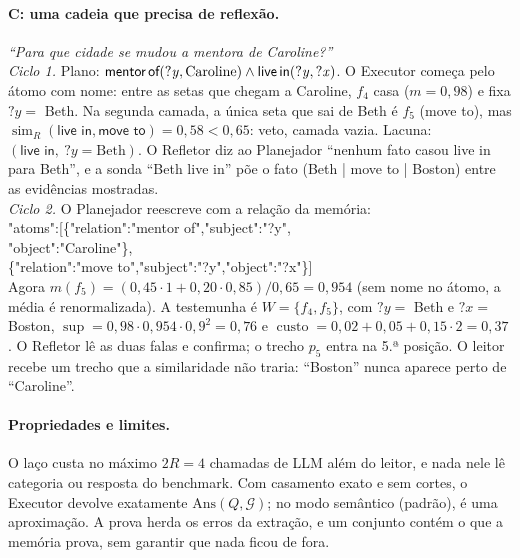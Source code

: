 \documentclass[10pt,twocolumn]{article}
\theoremstyle{definition}
\newcommand{\rel}[1]{\textsf{#1}}
\newcommand{\V}[1]{\mathord{?}\mathit{#1}}
\newcommand{\G}{\mathcal{G}}
\newcommand{\sem}{\operatorname{sim}}
\DeclareMathOperator{\cost}{custo}
\DeclareMathOperator{\supp}{sup}
\begin{document}
\paragraph{C: uma cadeia que precisa de reflexão.} \emph{``Para que cidade
se mudou a mentora de Caroline?''}\\
\emph{Ciclo 1.} Plano:
$\rel{mentor\,of}(\V y,\text{Caroline})\wedge\rel{live\,in}(\V y,\V x)$. O
Executor começa pelo átomo com nome: entre as setas que chegam a Caroline,
$f_4$ casa ($m=0{,}98$) e fixa $\V y=$ Beth. Na segunda camada, a única seta
que sai de Beth é $f_5$ (\rel{move to}), mas
$\sem_R(\rel{live in},\rel{move to})=0{,}58<0{,}65$: veto, camada vazia.
Lacuna: $(\rel{live in},\ \V y{=}\text{Beth})$. O Refletor diz ao Planejador
``nenhum fato casou \rel{live in} para Beth'', e a sonda ``Beth live in''
põe o fato (Beth | move to | Boston) entre as evidências mostradas.\\
\emph{Ciclo 2.} O Planejador reescreve com a relação da memória:\\[1pt]
{\scriptsize\ttfamily\setlength{\parskip}{0pt}%
\hspace*{1mm}"atoms":[\{"relation":"mentor of","subject":"?y",\\
\hspace*{11mm}"object":"Caroline"\},\\
\hspace*{11mm}\{"relation":"move to","subject":"?y","object":"?x"\}]}\\[2pt]
Agora $m(f_5)=(0{,}45\cdot1+0{,}20\cdot0{,}85)/0{,}65=0{,}954$ (sem nome no
átomo, a média é renormalizada). A testemunha é $W=\{f_4,f_5\}$, com
$\V y=$ Beth e $\V x=$ Boston, $\supp=0{,}98\cdot0{,}954\cdot0{,}9^2=0{,}76$ e
$\cost=0{,}02+0{,}05+0{,}15\cdot2=0{,}37$. O Refletor lê as duas falas e
confirma; o trecho $p_5$ entra na 5.ª posição. O leitor recebe um trecho que
a similaridade não traria: ``Boston'' nunca aparece perto de ``Caroline''.

\paragraph{Propriedades e limites.} O laço custa no máximo $2R=4$ chamadas de
LLM além do leitor, e nada nele lê categoria ou resposta do benchmark. Com
casamento exato e sem cortes, o Executor devolve exatamente
$\mathrm{Ans}(Q,\G)$; no modo semântico (padrão), é uma aproximação. A prova
herda os erros da extração, e um conjunto contém o que a memória prova, sem
garantir que nada ficou de fora.
\end{document}
